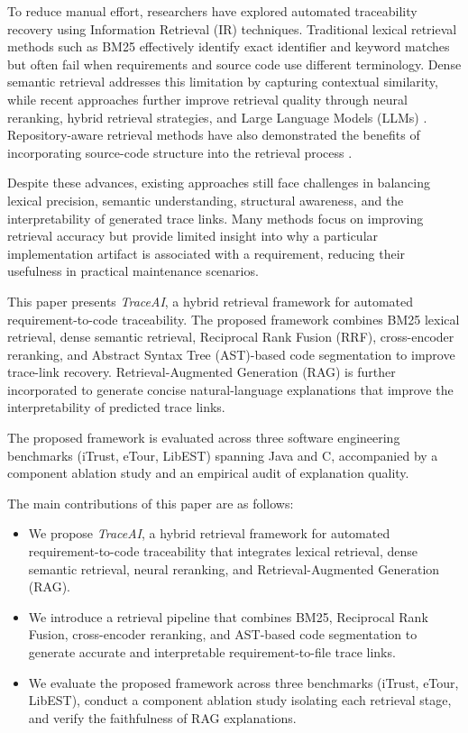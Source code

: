 \documentclass[conference]{IEEEtran}
\begin{document}
To reduce manual effort, researchers have explored automated traceability recovery using Information Retrieval (IR) techniques. Traditional lexical retrieval methods such as BM25 \cite{ref13} effectively identify exact identifier and keyword matches but often fail when requirements and source code use different terminology. Dense semantic retrieval addresses this limitation by capturing contextual similarity, while recent approaches further improve retrieval quality through neural reranking, hybrid retrieval strategies, and Large Language Models (LLMs) \cite{ref2,ref7,ref8}. Repository-aware retrieval methods have also demonstrated the benefits of incorporating source-code structure into the retrieval process \cite{ref9,ref10,ref11}.

Despite these advances, existing approaches still face challenges in balancing lexical precision, semantic understanding, structural awareness, and the interpretability of generated trace links. Many methods focus on improving retrieval accuracy but provide limited insight into why a particular implementation artifact is associated with a requirement, reducing their usefulness in practical maintenance scenarios.

This paper presents \textit{TraceAI}, a hybrid retrieval framework for automated requirement-to-code traceability. The proposed framework combines BM25 lexical retrieval, dense semantic retrieval, Reciprocal Rank Fusion (RRF), cross-encoder reranking, and Abstract Syntax Tree (AST)-based code segmentation to improve trace-link recovery. Retrieval-Augmented Generation (RAG) is further incorporated to generate concise natural-language explanations that improve the interpretability of predicted trace links.

The proposed framework is evaluated across three software engineering benchmarks (iTrust, eTour, LibEST) spanning Java and C, accompanied by a component ablation study and an empirical audit of explanation quality.

The main contributions of this paper are as follows:

\begin{itemize}
    \item We propose \textit{TraceAI}, a hybrid retrieval framework for automated requirement-to-code traceability that integrates lexical retrieval, dense semantic retrieval, neural reranking, and Retrieval-Augmented Generation (RAG).

    \item We introduce a retrieval pipeline that combines BM25, Reciprocal Rank Fusion, cross-encoder reranking, and AST-based code segmentation to generate accurate and interpretable requirement-to-file trace links.

    \item We evaluate the proposed framework across three benchmarks (iTrust, eTour, LibEST), conduct a component ablation study isolating each retrieval stage, and verify the faithfulness of RAG explanations.
\end{itemize}
\end{document}

